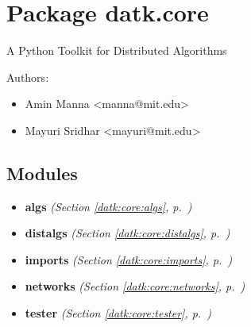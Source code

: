 %
%
%


\section{Package datk.core}

    \label{datk:core}
A Python Toolkit for Distributed Algorithms

Authors:

\begin{itemize}
\setlength{\parskip}{0.6ex}
  \item Amin Manna {\textless}manna@mit.edu{\textgreater}

  \item Mayuri Sridhar {\textless}mayuri@mit.edu{\textgreater}

\end{itemize}



\subsection{Modules}

\begin{itemize}
\setlength{\parskip}{0ex}
\item \textbf{algs}
  \textit{(Section \ref{datk:core:algs}, p.~\pageref{datk:core:algs})}

\item \textbf{distalgs}
  \textit{(Section \ref{datk:core:distalgs}, p.~\pageref{datk:core:distalgs})}

\item \textbf{imports}
  \textit{(Section \ref{datk:core:imports}, p.~\pageref{datk:core:imports})}

\item \textbf{networks}
  \textit{(Section \ref{datk:core:networks}, p.~\pageref{datk:core:networks})}

\item \textbf{tester}
  \textit{(Section \ref{datk:core:tester}, p.~\pageref{datk:core:tester})}

\end{itemize}



